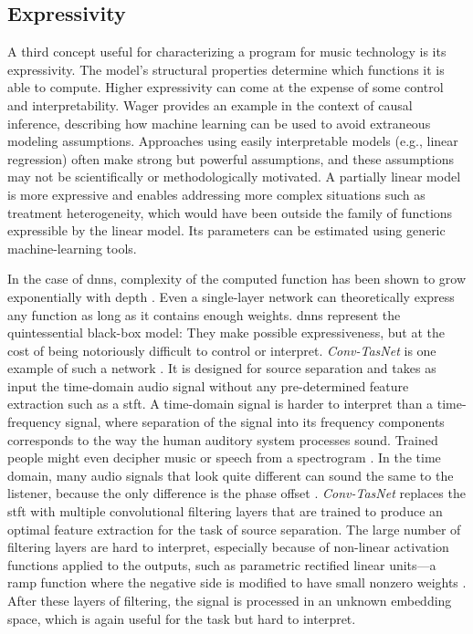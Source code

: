 \subsection{Expressivity}
A third concept useful for characterizing a program for music technology is its expressivity. The model's structural properties determine which functions it is able to compute. Higher expressivity can come at the expense of some control and interpretability. Wager \cite{wager2019causal} provides an example in the context of causal inference, describing how machine learning can be used to avoid extraneous modeling assumptions. Approaches using easily interpretable models (e.g., linear regression) often make strong but powerful assumptions, and these assumptions may not be scientifically or methodologically motivated. A partially linear model is more expressive and enables addressing more complex situations such as treatment heterogeneity, which would have been outside the family of functions expressible by the linear model. Its parameters can be estimated using generic machine-learning tools. \cite{wager2019causal} 

In the case of \gls{dnn}s, complexity of the computed function has been shown to grow exponentially with depth \cite{raghu2017expressive}. Even a single-layer network can theoretically express any function as long as it contains enough weights. \gls{dnn}s represent the quintessential black-box model: They make possible expressiveness, but at the cost of being notoriously difficult to control or interpret. \textit{Conv-TasNet} is one example of such a network \cite{luo2019conv}. It is designed for source separation and takes as input the time-domain audio signal without any pre-determined feature extraction such as a \gls{stft}. A time-domain signal is harder to interpret than a time-frequency signal, where separation of the signal into its frequency  components corresponds to the way the human auditory system processes sound. Trained people might even decipher music or speech from a spectrogram \cite[][Ch.~3, p.~41]{raphael-i547}. In the time domain, many audio signals that look quite different can sound the same to the listener, because the only difference is the phase offset \cite{engel2020ddsp}. \textit{Conv-TasNet} replaces the \gls{stft} with multiple convolutional filtering layers that are trained to produce an optimal feature extraction for the task of source separation. The large number of filtering layers are hard to interpret, especially because of non-linear activation functions applied to the outputs, such as parametric rectified linear units---a ramp function where the negative side is modified to have small nonzero weights \cite{he2015delving}. After these layers of filtering, the signal is processed in an unknown embedding space, which is again useful for the task but hard to interpret.

